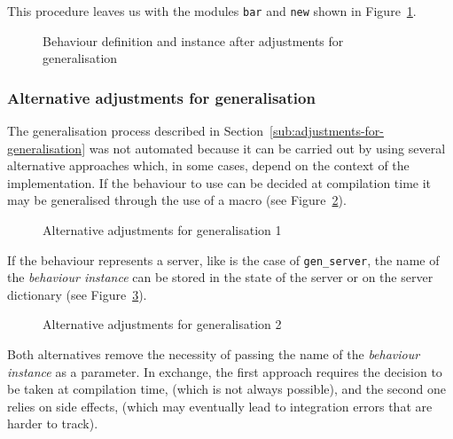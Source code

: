 This procedure leaves us with the modules \texttt{bar} and \texttt{new}
shown in Figure~\ref{fig:manual_adj}.

\begin{figure}
\begin{minipage}[t]{0.6\textwidth}%
%
\end{minipage}%
\begin{minipage}[t]{0.4\textwidth}%
%
\end{minipage}

\caption{Behaviour definition and instance after adjustments for 
generalisation\label{fig:manual_adj}}
\end{figure}



\subsubsection{Alternative adjustments for 
generalisation\label{sub:alternative-adjustments-for-generalisation}}

The generalisation process described in 
Section~\ref{sub:adjustments-for-generalisation}
was not automated because it can be carried out by using several alternative
approaches which, in some cases, depend on the context of the implementation.
If the behaviour to use can be decided at compilation time it may
be generalised through the use of a macro (see 
Figure~\ref{fig:bar_manual_adj_b}).
\begin{figure}

\caption{Alternative adjustments for generalisation 
1\label{fig:bar_manual_adj_b}}
\end{figure}
If the behaviour represents a server, like is the case of \texttt{gen\_server},
the name of the \emph{behaviour instance} can be stored in the state
of the server or on the server dictionary (see 
Figure~\ref{fig:bar_manual_adj_c}).
\begin{figure}

\caption{Alternative adjustments for generalisation 
2\label{fig:bar_manual_adj_c}}
\end{figure}


Both alternatives remove the necessity of passing the name of the
\emph{behaviour instance} as a parameter. In exchange, the first approach
requires the decision to be taken at compilation time, (which is not
always possible), and the second one relies on side effects, (which
may eventually lead to integration errors that are harder to track).


